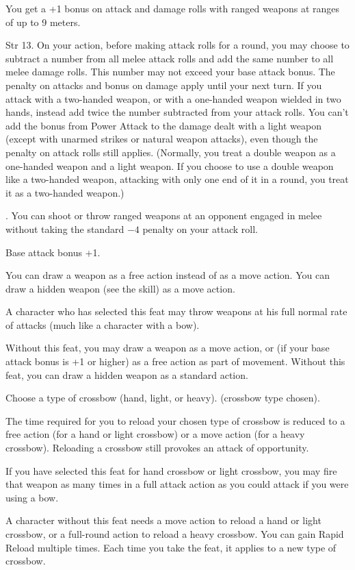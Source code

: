 {}
{You get a +1 bonus on attack and damage rolls with ranged weapons at ranges of up to 9 meters.}

{}
{Str 13.}
{On your action, before making attack rolls for a round, you may choose to subtract a number from all melee attack rolls and add the same number to all melee damage rolls. This number may not exceed your base attack bonus. The penalty on attacks and bonus on damage apply until your next turn.}
{If you attack with a two-handed weapon, or with a one-handed weapon wielded in two hands, instead add twice the number subtracted from your attack rolls. You can't add the bonus from Power Attack to the damage dealt with a light weapon (except with unarmed strikes or natural weapon attacks), even though the penalty on attack rolls still applies. (Normally, you treat a double weapon as a one-handed weapon and a light weapon. If you choose to use a double weapon like a two-handed weapon, attacking with only one end of it in a round, you treat it as a two-handed weapon.)}{}

{.}
{You can shoot or throw ranged weapons at an opponent engaged in melee without taking the standard $-4$ penalty on your attack roll.}

{}
{Base attack bonus +1.}
{You can draw a weapon as a free action instead of as a move action. You can draw a hidden weapon (see the  skill) as a move action.

A character who has selected this feat may throw weapons at his full normal rate of attacks (much like a character with a bow).}
{Without this feat, you may draw a weapon as a move action, or (if your base attack bonus is +1 or higher) as a free action as part of movement. Without this feat, you can draw a hidden weapon as a standard action.}{}

{Choose a type of crossbow (hand, light, or heavy).}
{ (crossbow type chosen).}
{The time required for you to reload your chosen type of crossbow is reduced to a free action (for a hand or light crossbow) or a move action (for a heavy crossbow). Reloading a crossbow still provokes an attack of opportunity.

If you have selected this feat for hand crossbow or light crossbow, you may fire that weapon as many times in a full attack action as you could attack if you were using a bow.}
{A character without this feat needs a move action to reload a hand or light crossbow, or a full-round action to reload a heavy crossbow.}
{You can gain Rapid Reload multiple times. Each time you take the feat, it applies to a new type of crossbow.}

